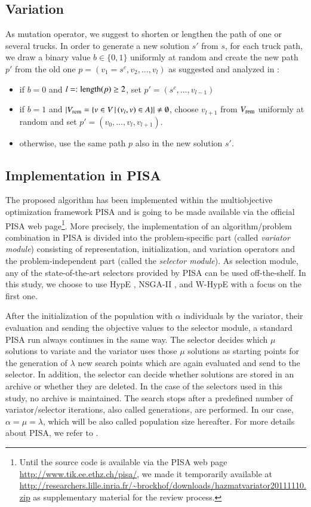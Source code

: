 \documentclass[preprint,12pt]{elsarticle}
\begin{document}
\subsection{Variation}\label{sec:variation}
As mutation operator, we suggest to shorten or lengthen the path of one or several trucks. In order to generate a new solution $s'$ from $s$, for each truck path, we draw a binary value $b\in\{0,1\}$ uniformly at random and create the new path $p'$ from the old one $p=(v_1=s^c,v_2,\ldots, v_l)$ as suggested and analyzed in \citep{horo2009a}:
\begin{itemize}
	\item if $b = 0$ and $l=:\textnormal{length}(p)\geq 2$, set $p' = (s^c, \ldots, v_{l-1})$	
	\item if $b = 1$ and $|V_{\textnormal{\scriptsize rem}}=\{v \in V \,|\, (v_{l}, v) \in A\}| \neq\emptyset$, choose $v_{l+1}$ from $V_{\textnormal{\scriptsize rem}}$ uniformly at random and set $p' = (v_0, \ldots, v_l, v_{l+1})$.
	\item otherwise, use the same path $p$ also in the new solution $s'$.
\end{itemize}

\subsection{Implementation in PISA}
The proposed algorithm has been implemented within the multiobjective optimization framework PISA \citep{bltz2003a} and is going to be made available via the official PISA web page\footnote{Until the source code is available via the PISA web page \url{http://www.tik.ee.ethz.ch/pisa/}, we made it temporarily available at \url{http://researchers.lille.inria.fr/~brockhof/downloads/hazmatvariator20111110.zip} as supplementary material for the review process.}. More precisely, the implementation of an algorithm/problem combination in PISA is divided into the problem-specific part (called \emph{variator module}) consisting of representation, initialization, and variation operators and the problem-independent part (called the \emph{selector module}). As selection module, any of the state-of-the-art selectors provided by PISA can be used off-the-shelf. In this study, we choose to use HypE \citep{bz2011a}, NSGA-II \citep{dapm2002a}, and W-HypE \citep{abbz2009b,bbtz2011a} with a focus on the first one.

After the initialization of the population with $\alpha$ individuals by the variator, their evaluation and sending the objective values to the selector module, a standard PISA run always continues in the same way. The selector decides which $\mu$ solutions to variate and the variator uses those $\mu$ solutions as starting points for the generation of $\lambda$ new search points which are again evaluated and send to the selector. In addition, the selector can decide whether solutions are stored in an archive or whether they are deleted. In the case of the selectors used in this study, no archive is maintained. The search stops after a predefined number of variator/selector iterations, also called generations, are performed. In our case, $\alpha=\mu=\lambda$, which will be also called population size hereafter. For more details about PISA, we refer to \citep{bltz2003a}.
\end{document}
